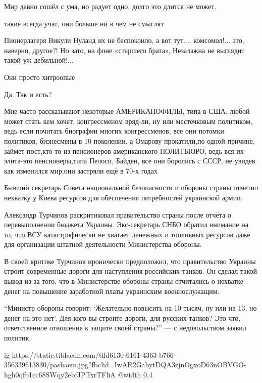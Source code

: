 \begin{itemize}
Мир давно сошёл с ума, но радует одно, долго это длится не может.

такие всегда учат, они больше ни в чем не смыслят


Пионерлагеря Викули Нуланд их не беспокоило, а вот тут.... комсомол!... это,
наверно, другое?! Но зато, на фоне «старшего брата», Незалэжна не выглядит
такой уж дебильной!...


Они просто хитроопые

Да. Так и есть?


Мне часто рассказывают некоторые АМЕРИКАНОФИЛЫ, типа в США, любой может стать
кем хочет, конгрессменом вряд-ли, ну или местечковым политиком, ведь если
почитать биографии многих конгрессменов, все они потомки политиков, бизнесмены
в 10 поколении, а Омарову прокатили,по одной причине, займет пост,кто-то из
пенсионеров американского ПОЛИТБЮРО, ведь вся их элита-это пенсионеры,типа
Пелоси, Байден, все они боролись с СССР, не увидев как изменился мир,они
застряли ещё в 70-х годах



Бывший секретарь Совета национальной безопасности и обороны страны отметил
нехватку у Киева ресурсов для обеспечения потребностей украинской армии.

Александр Турчинов раскритиковал правительство страны после отчёта о
перевыполнении бюджета Украины. Экс-секретарь СНБО обратил внимание на то, что
ВСУ катастрофически не хватает денежных и топливных ресурсов даже для
организации штатной деятельности Министерства обороны.

В своей критике Турчинов иронически предположил, что правительство Украины
строит современные дороги для наступления российских танков. Он сделал такой
вывод из-за того, что в Министерстве обороны страны отчитались о нехватке денег
на повышение заработной платы украинским военнослужащим.

\enquote{Министр обороны говорит: \enquote{Желательно повысить на 10 тысяч, ну
или на 13, но денег на это нет}. Для кого вы строите дороги, для русских
танков? Это что, ответственное отношение к защите своей страны?} — с
недовольством заявил политик.

\ifcmt
  ig https://static.tildacdn.com/tild6130-6161-4363-b766-356339613830/pashaem.jpg?fbclid=IwAR2GabytDQA3zjnOgxoD63nOBVGO-hgh0qfb1cc68SWqy2ebfJPTxrTFliA
  @width 0.4


\end{itemize}
